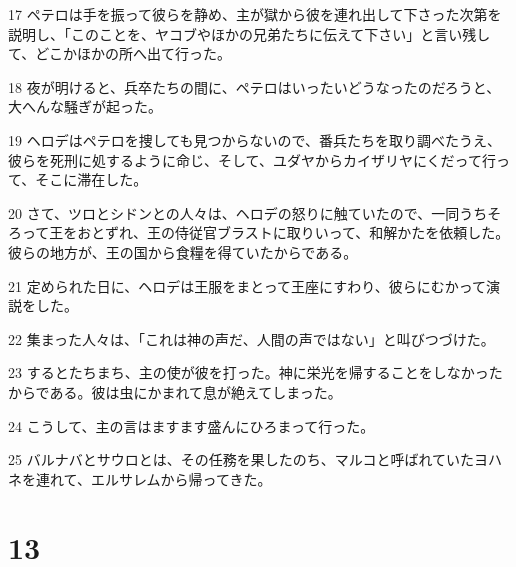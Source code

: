 \par 17 ペテロは手を振って彼らを静め、主が獄から彼を連れ出して下さった次第を説明し、「このことを、ヤコブやほかの兄弟たちに伝えて下さい」と言い残して、どこかほかの所へ出て行った。
\par 18 夜が明けると、兵卒たちの間に、ペテロはいったいどうなったのだろうと、大へんな騒ぎが起った。
\par 19 ヘロデはペテロを捜しても見つからないので、番兵たちを取り調べたうえ、彼らを死刑に処するように命じ、そして、ユダヤからカイザリヤにくだって行って、そこに滞在した。
\par 20 さて、ツロとシドンとの人々は、ヘロデの怒りに触ていたので、一同うちそろって王をおとずれ、王の侍従官ブラストに取りいって、和解かたを依頼した。彼らの地方が、王の国から食糧を得ていたからである。
\par 21 定められた日に、ヘロデは王服をまとって王座にすわり、彼らにむかって演説をした。
\par 22 集まった人々は、「これは神の声だ、人間の声ではない」と叫びつづけた。
\par 23 するとたちまち、主の使が彼を打った。神に栄光を帰することをしなかったからである。彼は虫にかまれて息が絶えてしまった。
\par 24 こうして、主の言はますます盛んにひろまって行った。
\par 25 バルナバとサウロとは、その任務を果したのち、マルコと呼ばれていたヨハネを連れて、エルサレムから帰ってきた。

\chapter{13}


